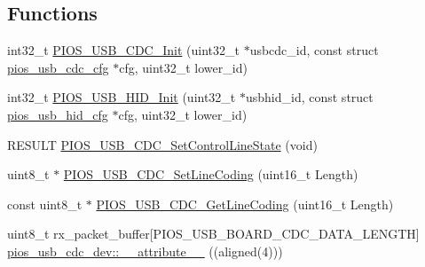 \subsection*{\-Functions}
\begin{DoxyCompactItemize}
\item 
int32\-\_\-t \hyperlink{group___p_i_o_s___u_s_b___c_o_m_ga30299ce46992751181aeb3d997b75ca8}{\-P\-I\-O\-S\-\_\-\-U\-S\-B\-\_\-\-C\-D\-C\-\_\-\-Init} (uint32\-\_\-t $\ast$usbcdc\-\_\-id, const struct \hyperlink{structpios__usb__cdc__cfg}{pios\-\_\-usb\-\_\-cdc\-\_\-cfg} $\ast$cfg, uint32\-\_\-t lower\-\_\-id)
\item 
int32\-\_\-t \hyperlink{group___p_i_o_s___u_s_b___c_o_m_ga4ea302beb0afbb7a83ff9ff1b20eb9cc}{\-P\-I\-O\-S\-\_\-\-U\-S\-B\-\_\-\-H\-I\-D\-\_\-\-Init} (uint32\-\_\-t $\ast$usbhid\-\_\-id, const struct \hyperlink{structpios__usb__hid__cfg}{pios\-\_\-usb\-\_\-hid\-\_\-cfg} $\ast$cfg, uint32\-\_\-t lower\-\_\-id)
\item 
\-R\-E\-S\-U\-L\-T \hyperlink{group___p_i_o_s___u_s_b___c_o_m_gacbf6b3b4149e51a74c2f4255f0f8a199}{\-P\-I\-O\-S\-\_\-\-U\-S\-B\-\_\-\-C\-D\-C\-\_\-\-Set\-Control\-Line\-State} (void)
\item 
uint8\-\_\-t $\ast$ \hyperlink{group___p_i_o_s___u_s_b___c_o_m_ga120d6d9cf08ed1125a62ea6759047914}{\-P\-I\-O\-S\-\_\-\-U\-S\-B\-\_\-\-C\-D\-C\-\_\-\-Set\-Line\-Coding} (uint16\-\_\-t \-Length)
\item 
const uint8\-\_\-t $\ast$ \hyperlink{group___p_i_o_s___u_s_b___c_o_m_ga41d64940656273048e2558acb7609dc4}{\-P\-I\-O\-S\-\_\-\-U\-S\-B\-\_\-\-C\-D\-C\-\_\-\-Get\-Line\-Coding} (uint16\-\_\-t \-Length)
\item 
uint8\-\_\-t rx\-\_\-packet\-\_\-buffer\mbox{[}\-P\-I\-O\-S\-\_\-\-U\-S\-B\-\_\-\-B\-O\-A\-R\-D\-\_\-\-C\-D\-C\-\_\-\-D\-A\-T\-A\-\_\-\-L\-E\-N\-G\-T\-H\mbox{]} \hyperlink{group___p_i_o_s___u_s_b___c_o_m_gab58a69ef6ffba4b36cf99ba5dfd9798c}{pios\-\_\-usb\-\_\-cdc\-\_\-dev\-::\-\_\-\-\_\-attribute\-\_\-\-\_\-} ((aligned(4)))
\end{DoxyCompactItemize}
